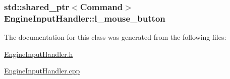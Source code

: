 \subsubsection[{l\+\_\+mouse\+\_\+button}]{\setlength{\rightskip}{0pt plus 5cm}std\+::shared\+\_\+ptr$<${\bf Command}$>$ Engine\+Input\+Handler\+::l\+\_\+mouse\+\_\+button\hspace{0.3cm}{\ttfamily [private]}}\label{class_engine_input_handler_a1d5d91670520e1424bf5dac389d65069}


The documentation for this class was generated from the following files\+:\begin{DoxyCompactItemize}
\item 
\hyperlink{_engine_input_handler_8h}{Engine\+Input\+Handler.\+h}\item 
\hyperlink{_engine_input_handler_8cpp}{Engine\+Input\+Handler.\+cpp}\end{DoxyCompactItemize}
